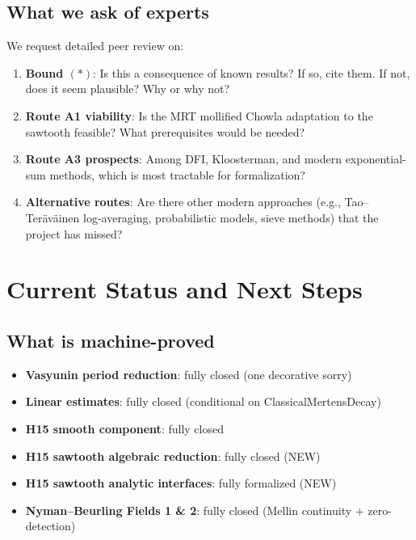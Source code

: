 \documentclass[11pt,a4paper]{article}
\begin{document}
\subsection{What we ask of experts}

We request detailed peer review on:

\begin{enumerate}
\item \textbf{Bound $(\ast)$}: Is this a consequence of known results? If so, cite them. If not, does it seem plausible? Why or why not?

\item \textbf{Route A1 viability}: Is the MRT mollified Chowla adaptation to the sawtooth feasible? What prerequisites would be needed?

\item \textbf{Route A3 prospects}: Among DFI, Kloosterman, and modern exponential-sum methods, which is most tractable for formalization?

\item \textbf{Alternative routes}: Are there other modern approaches (e.g., Tao--Teräväinen log-averaging, probabilistic models, sieve methods) that the project has missed?

\end{enumerate}

\section{Current Status and Next Steps}

\subsection{What is machine-proved}

\begin{itemize}
\item \textbf{Vasyunin period reduction}: fully closed (one decorative sorry)
\item \textbf{Linear estimates}: fully closed (conditional on ClassicalMertensDecay)
\item \textbf{H15 smooth component}: fully closed
\item \textbf{H15 sawtooth algebraic reduction}: fully closed (NEW)
\item \textbf{H15 sawtooth analytic interfaces}: fully formalized (NEW)
\item \textbf{Nyman--Beurling Fields 1 \& 2}: fully closed (Mellin continuity + zero-detection)
\end{itemize}
\end{document}
